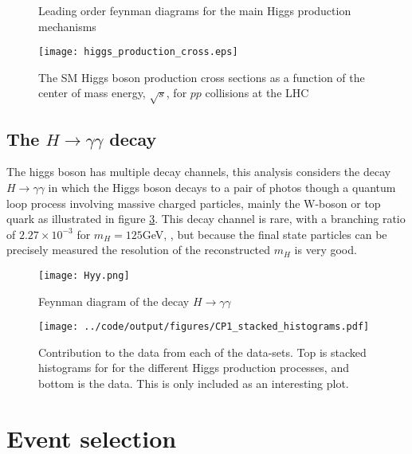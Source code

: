 \documentclass[10pt, aps, twocolumn, a4paper, nofootinbib]{revtex4}
\begin{document}
\begin{figure}
\centering
{}
\vspace{0.1cm}
\caption{Leading order feynman diagrams for the main Higgs production mechanisms\label{fig:higgs_production_feynman}}
\end{figure}

\begin{figure}
\texttt{[image: higgs\_production\_cross.eps]}
\caption{The SM Higgs boson production cross sections as a function of the center of mass energy, $\sqrt{s}$, for $pp$ collisions at the LHC \citep{PhysRevD.98.030001.2018} \label{fig:H_prod_cross}}
\end{figure}

\subsection{The $H\rightarrow \gamma \gamma$ decay}
The higgs boson has multiple decay channels, this analysis considers the decay $H\rightarrow\gamma\gamma$ in which the Higgs boson decays to a pair of photos though a quantum loop process involving massive charged particles, mainly the W-boson or top quark as illustrated in figure \ref{fig:Hyy_feynman}. This decay channel is rare, with a branching ratio of $2.27 \times 10^{-3}$ for $m_H=125$GeV, \citep{PhysRevD.98.030001.2018}, but because the final state particles can be precisely measured the resolution of the reconstructed $m_H$ is very good.

\begin{figure}
\centering
\texttt{[image: Hyy.png]}
\caption{Feynman diagram of the decay $H\rightarrow\gamma\gamma$ \label{fig:Hyy_feynman}}
\end{figure}

\begin{figure}
	\centering
	\texttt{[image: ../code/output/figures/CP1\_stacked\_histograms.pdf]}
	\caption{Contribution to the data from each of the data-sets. Top is stacked histograms for for the different Higgs production processes, and bottom is the data. This is only included as an interesting plot. \label{fig:CP1_stacked}}
\end{figure}

\section{Event selection}
\end{document}
